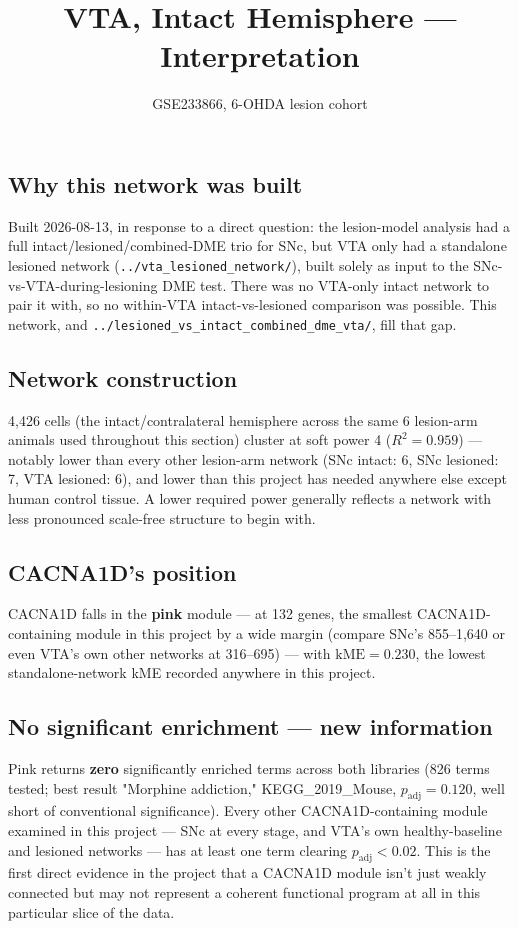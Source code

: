 \documentclass[11pt]{article}
\title{VTA, Intact Hemisphere --- Interpretation}
\author{GSE233866, 6-OHDA lesion cohort}
\date{}
\begin{document}
\maketitle

\subsection*{Why this network was built}

Built 2026-08-13, in response to a direct question: the lesion-model analysis had a full
intact/lesioned/combined-DME trio for SNc, but VTA only had a standalone lesioned network
(\texttt{../vta\_lesioned\_network/}), built solely as input to the SNc-vs-VTA-during-lesioning
DME test. There was no VTA-only intact network to pair it with, so no within-VTA
intact-vs-lesioned comparison was possible. This network, and
\texttt{../lesioned\_vs\_intact\_combined\_dme\_vta/}, fill that gap.

\subsection*{Network construction}

4{,}426 cells (the intact/contralateral hemisphere across the same 6 lesion-arm animals used
throughout this section) cluster at soft power 4 ($R^2=0.959$) --- notably lower than every
other lesion-arm network (SNc intact: 6, SNc lesioned: 7, VTA lesioned: 6), and lower than
this project has needed anywhere else except human control tissue. A lower required power
generally reflects a network with less pronounced scale-free structure to begin with.

\subsection*{CACNA1D's position}

CACNA1D falls in the \textbf{pink} module --- at 132 genes, the smallest CACNA1D-containing
module in this project by a wide margin (compare SNc's 855--1{,}640 or even VTA's own other
networks at 316--695) --- with $\mathrm{kME}=0.230$, the lowest standalone-network kME
recorded anywhere in this project.

\subsection*{No significant enrichment --- new information}

Pink returns \textbf{zero} significantly enriched terms across both libraries (826 terms
tested; best result "Morphine addiction," KEGG\_2019\_Mouse, $p_{\mathrm{adj}}=0.120$, well
short of conventional significance). Every other CACNA1D-containing module examined in this
project --- SNc at every stage, and VTA's own healthy-baseline and lesioned networks --- has
at least one term clearing $p_{\mathrm{adj}}<0.02$. This is the first direct evidence in the
project that a CACNA1D module isn't just weakly connected but may not represent a coherent
functional program at all in this particular slice of the data.
\end{document}
